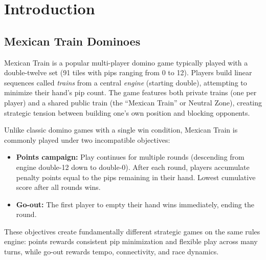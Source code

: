 \documentclass[11pt,letterpaper]{article}
\begin{document}
\begin{abstract}
A \textbf{separate} \textbf{255{,}500-game} go-out campaign (511 cells; Epsilon omitted) evaluates go-out module forks (Salamander Surge, Trail Momentum, Desperation Dig, Hand Exchange, Hot Potato pass). Those mechanics are \emph{not} apples-to-apples with points; we report them in their own figures and do not merge $S$ averages across objectives except in one deliberate shared-ID contrast plot.

Finally, we report on \textbf{Class $\Omega$}, a neural self-play agent that achieves parity with heuristic baselines in small games and outperforms in large fleets. All code, data, and reproduction scripts are available as open source.
\end{abstract}

\section{Introduction}

\subsection{Mexican Train Dominoes}

Mexican Train is a popular multi-player domino game typically played with a double-twelve set (91 tiles with pips ranging from 0 to 12). Players build linear sequences called \textit{trains} from a central \textit{engine} (starting double), attempting to minimize their hand's pip count. The game features both private trains (one per player) and a shared public train (the ``Mexican Train'' or Neutral Zone), creating strategic tension between building one's own position and blocking opponents.

Unlike classic domino games with a single win condition, Mexican Train is commonly played under two incompatible objectives:
\begin{itemize}
\item \textbf{Points campaign:} Play continues for multiple rounds (descending from engine double-12 down to double-0). After each round, players accumulate penalty points equal to the pips remaining in their hand. Lowest cumulative score after all rounds wins.
\item \textbf{Go-out:} The first player to empty their hand wins immediately, ending the round.
\end{itemize}

These objectives create fundamentally different strategic games on the same rules engine: points rewards consistent pip minimization and flexible play across many turns, while go-out rewards tempo, connectivity, and race dynamics.
\end{document}
